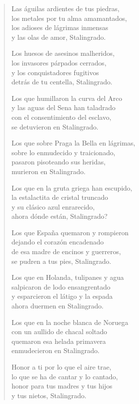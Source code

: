 \documentclass[12pt]{article}
\begin{document}
\begin{verse}
Las águilas ardientes de tus piedras,\\
los metales por tu alma amamantados,\\
los adioses de lágrimas inmensas\\
y las olas de amor, Stalingrado.  

Los huesos de asesinos malheridos,\\
los invasores párpados cerrados,\\
y los conquistadores fugitivos\\
detrás de tu centella, Stalingrado.  

Los que humillaron la curva del Arco\\
y las aguas del Sena han taladrado\\
con el consentimiento del esclavo,\\
se detuvieron en Stalingrado.  

Los que sobre Praga la Bella en lágrimas,\\
sobre lo enmudecido y traicionado,\\
pasaron pisoteando sus heridas,\\
murieron en Stalingrado.  

Los que en la gruta griega han escupido,\\
la estalactita de cristal truncado\\
y su clásico azul enrarecido,\\
ahora dónde están, Stalingrado?  

Los que España quemaron y rompieron\\
dejando el corazón encadenado\\
de esa madre de encinos y guerreros,\\
se pudren a tus pies, Stalingrado.  

Los que en Holanda, tulipanes y agua\\
salpicaron de lodo ensangrentado\\
y esparcieron el látigo y la espada\\
ahora duermen en Stalingrado.  

Los que en la noche blanca de Noruega\\
con un aullido de chacal soltado\\
quemaron esa helada primavera\\
enmudecieron en Stalingrado.  

Honor a ti por lo que el aire trae,\\
lo que se ha de cantar y lo cantado,\\
honor para tus madres y tus hijos\\
y tus nietos, Stalingrado.  


\end{verse}
\end{document}
